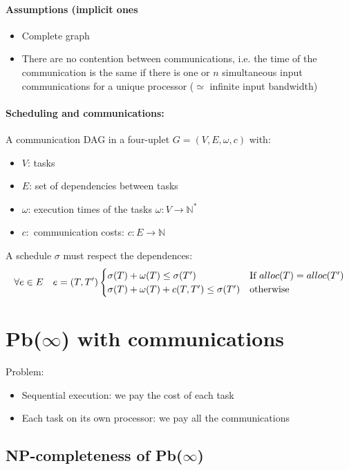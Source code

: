 \documentclass{article}
\begin{document}
\paragraph{Assumptions (implicit ones}
\begin{itemize}
\item Complete graph
\item There are no contention between communications, i.e. the time of the communication is the same if there is one or $n$ simultaneous input communications for a unique processor ($\simeq$ infinite input bandwidth)
\end{itemize}

\paragraph{Scheduling and communications:} A communication DAG in a four-uplet $G=(V,E,\omega,c)$ with:
\begin{itemize}
\item $V$: tasks
\item $E$: set of dependencies between tasks
\item $\omega$: execution times of the tasks $\omega: V \to \mathbb{N}^*$
\item $c:$ communication costs: $c:E\to \mathbb{N}$
\end{itemize}


A schedule $\sigma$ must respect the dependences:
\[
\forall e \in E \quad e=(T,T') 
\begin{cases}
\sigma(T)+\omega(T)\leq \sigma(T') & $If $alloc(T)=alloc(T')\\
\sigma(T) + \omega(T)+c(T,T')\leq \sigma(T') & $otherwise$
\end{cases}\]

\section{Pb($\infty$) with communications}
Problem:
\begin{itemize}
\item Sequential execution: we pay the cost of each task
\item Each task on its own processor: we pay all the communications
\end{itemize}

\subsection{NP-completeness of Pb($\infty$)}
\end{document}
